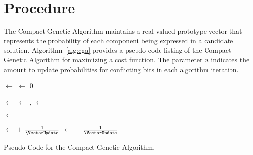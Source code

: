 \documentclass[a4paper, 11pt]{article}
\begin{document}
\section{Procedure}
\label{sec:procedure}
The Compact Genetic Algorithm maintains a real-valued prototype vector that represents the probability of each component being expressed in a candidate solution. 
Algorithm~\ref{alg:cga} provides a pseudo-code listing of the Compact Genetic Algorithm for maximizing a cost function. The parameter $n$ indicates the amount to update probabilities for conflicting bits in each algorithm iteration.

\begin{algorithm}[htp]
	\SetLine  

	
	

  
	\KwIn{\NumBits, \VectorUpdate}		
	\KwOut{\Best}

	\Vector $\leftarrow$ \;
	\Best $\leftarrow$ $0$\;
	
	\While{$\neg$\StopCondition{}} {
		\CandidateOne $\leftarrow$ \GenerateSamples{\Vector}\;
		\CandidateTwo $\leftarrow$ \GenerateSamples{\Vector}\;
		\Winner, \Loser $\leftarrow$ \SelectWinnerAndLoser{\CandidateOne, \CandidateTwo}\;

		\If{\Cost{\Winner} $\leq$ \Cost{\Best}} {
			\Best $\leftarrow$ \Winner\;
		}

		 {
			\If{\WinnerBit $\neq$ \LoserBit} {
				 {
					\VectorBit $\leftarrow$ \VectorBit $+$ $\frac{1}{\VectorUpdate}$\;
				}{
					\VectorBit $\leftarrow$ \VectorBit $-$ $\frac{1}{\VectorUpdate}$\;
				}
			}
		}		
	}
	\Return{\Best}\;
	
	\caption{Pseudo Code for the Compact Genetic Algorithm.}
	\label{alg:cga}
\end{algorithm}
\end{document}
